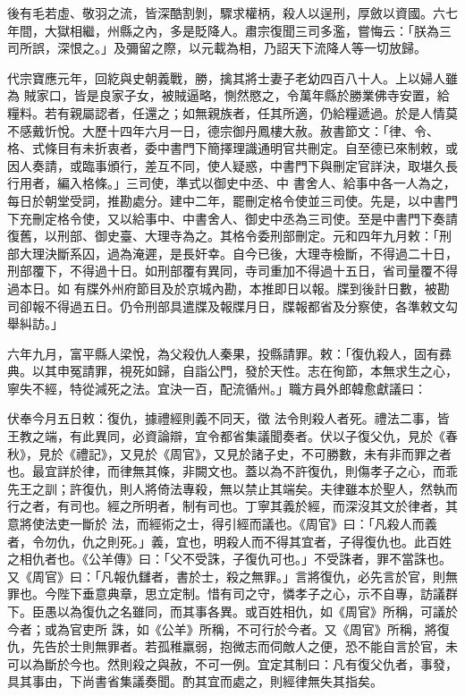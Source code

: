 \begin{pinyinscope}
 後有毛若虛、敬羽之流，皆深酷割剝，驟求權柄，殺人以逞刑，厚斂以資國。六七年間，大獄相繼，州縣之內，多是貶降人。肅宗復聞三司多濫，嘗悔云：「朕為三司所誤，深恨之。」及彌留之際，以元載為相，乃詔天下流降人等一切放歸。



 代宗寶應元年，回紇與史朝義戰，勝，擒其將士妻子老幼四百八十人。上以婦人雖為
 賊家口，皆是良家子女，被賊逼略，惻然愍之，令萬年縣於勝業佛寺安置，給糧料。若有親屬認者，任還之；如無親族者，任其所適，仍給糧遞過。於是人情莫不感戴忻悅。大歷十四年六月一日，德宗御丹鳳樓大赦。赦書節文：「律、令、格、式條目有未折衷者，委中書門下簡擇理識通明官共刪定。自至德已來制敕，或因人奏請，或臨事頒行，差互不同，使人疑惑，中書門下與刪定官詳決，取堪久長行用者，編入格條。」三司使，準式以御史中丞、中
 書舍人、給事中各一人為之，每日於朝堂受詞，推勘處分。建中二年，罷刪定格令使並三司使。先是，以中書門下充刪定格令使，又以給事中、中書舍人、御史中丞為三司使。至是中書門下奏請復舊，以刑部、御史臺、大理寺為之。其格令委刑部刪定。元和四年九月敕：「刑部大理決斷系囚，過為淹遲，是長奸幸。自今已後，大理寺檢斷，不得過二十日，刑部覆下，不得過十日。如刑部覆有異同，寺司重加不得過十五日，省司量覆不得過本日。如
 有牒外州府節目及於京城內勘，本推即日以報。牒到後計日數，被勘司卻報不得過五日。仍令刑部具遣牒及報牒月日，牒報都省及分察使，各準敕文勾舉糾訪。」



 六年九月，富平縣人梁悅，為父殺仇人秦果，投縣請罪。敕：「復仇殺人，固有彞典。以其申冤請罪，視死如歸，自詣公門，發於天性。志在徇節，本無求生之心，寧失不經，特從減死之法。宜決一百，配流循州。」職方員外郎韓愈獻議曰：



 伏奉今月五日敕：復仇，據禮經則義不同天，徵
 法令則殺人者死。禮法二事，皆王教之端，有此異同，必資論辯，宜令都省集議聞奏者。伏以子復父仇，見於《春秋》，見於《禮記》，又見於《周官》，又見於諸子史，不可勝數，未有非而罪之者也。最宜詳於律，而律無其條，非闕文也。蓋以為不許復仇，則傷孝子之心，而乖先王之訓；許復仇，則人將倚法專殺，無以禁止其端矣。夫律雖本於聖人，然執而行之者，有司也。經之所明者，制有司也。丁寧其義於經，而深沒其文於律者，其意將使法吏一斷於
 法，而經術之士，得引經而議也。《周官》曰：「凡殺人而義者，令勿仇，仇之則死。」義，宜也，明殺人而不得其宜者，子得復仇也。此百姓之相仇者也。《公羊傳》曰：「父不受誅，子復仇可也。」不受誅者，罪不當誅也。又《周官》曰：「凡報仇讎者，書於士，殺之無罪。」言將復仇，必先言於官，則無罪也。今陛下垂意典章，思立定制。惜有司之守，憐孝子之心，示不自專，訪議群下。臣愚以為復仇之名雖同，而其事各異。或百姓相仇，如《周官》所稱，可議於今者；或為官吏所
 誅，如《公羊》所稱，不可行於今者。又《周官》所稱，將復仇，先告於士則無罪者。若孤稚羸弱，抱微志而伺敵人之便，恐不能自言於官，未可以為斷於今也。然則殺之與赦，不可一例。宜定其制曰：凡有復父仇者，事發，具其事由，下尚書省集議奏聞。酌其宜而處之，則經律無失其指矣。




\end{pinyinscope}
